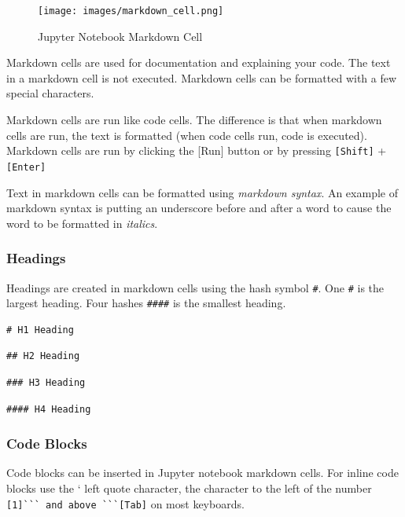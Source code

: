 \documentclass{book}
\begin{document}
\begin{figure}
\centering
\texttt{[image: images/markdown\_cell.png]}
\caption{Jupyter Notebook Markdown Cell}
\end{figure}

Markdown cells are used for documentation and explaining your code. The
text in a markdown cell is not executed. Markdown cells can be formatted
with a few special characters.

Markdown cells are run like code cells. The difference is that when
markdown cells are run, the text is formatted (when code cells run, code
is executed). Markdown cells are run by clicking the {[}Run{]} button or
by pressing \lstinline![Shift]! + \lstinline![Enter]!

Text in markdown cells can be formatted using \emph{markdown syntax}. An
example of markdown syntax is putting an underscore before and after a
word to cause the word to be formatted in \emph{italics}.

\subsubsection{Headings}\label{headings}

Headings are created in markdown cells using the hash symbol
\lstinline!#!. One \lstinline!#! is the largest heading. Four hashes
\lstinline!####! is the smallest heading.

\begin{lstlisting}
# H1 Heading
\end{lstlisting}

\begin{lstlisting}
## H2 Heading
\end{lstlisting}

\begin{lstlisting}
### H3 Heading
\end{lstlisting}

\begin{lstlisting}
#### H4 Heading
\end{lstlisting}

\subsubsection{Code Blocks}\label{code-blocks}

Code blocks can be inserted in Jupyter notebook markdown cells. For
inline code blocks use the ` left quote character, the character to the
left of the number \lstinline![1]``` and above ```[Tab]! on most
keyboards.
\end{document}
